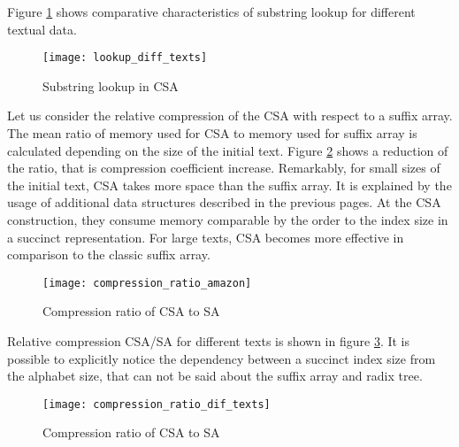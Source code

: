 Figure \ref{fig:CSA_Lookup_diff_texts} shows comparative characteristics of substring lookup
for different textual data.

\begin{figure}[ht!]
    \centering
    \texttt{[image: lookup\_diff\_texts]}
    \caption{Substring lookup in CSA}
    \label{fig:CSA_Lookup_diff_texts}
\end{figure}

Let us consider the relative compression of the CSA with respect to a suffix array.
The mean ratio of memory used for CSA to memory used for suffix array is calculated
depending on the size of the initial text. Figure \ref{fig:CSA_compression_ratio_amazon} shows
a reduction of the ratio, that is compression coefficient increase.
Remarkably, for small sizes of the initial text, CSA takes more space than the suffix array.
It is explained by the usage of additional data structures described in the previous pages.
At the CSA construction, they consume memory comparable by the order to the index size
in a succinct representation. For large texts, CSA becomes more effective in comparison to
the classic suffix array.

\begin{figure}[ht!]
    \centering
    \texttt{[image: compression\_ratio\_amazon]}
    \caption{Compression ratio of CSA to SA}
    \label{fig:CSA_compression_ratio_amazon}
\end{figure}

Relative compression CSA/SA for different texts is shown in figure \ref{fig:CSA_compression_ratio_dif_texts}.
It is possible to explicitly notice the dependency between a succinct index size from the alphabet size,
that can not be said about the suffix array and radix tree.

\begin{figure}[ht!]
    \centering
    \texttt{[image: compression\_ratio\_dif\_texts]}
    \caption{Compression ratio of CSA to SA}
    \label{fig:CSA_compression_ratio_dif_texts}
\end{figure}
